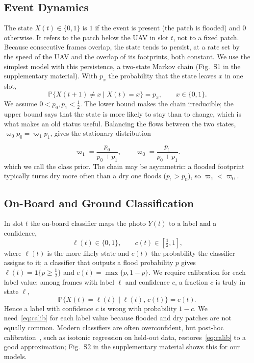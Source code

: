 \documentclass[10pt,journal,compsoc]{IEEEtran}
\theoremstyle{remark}
\newcommand{\Prob}{\mathbb{P}}
\newcommand{\ind}[1]{\mathbf{1}\{#1\}}
\newcommand{\lab}{\ell}
\begin{document}
\subsection{Event Dynamics}\label{sec:src}
The state $X(t)\in\{0,1\}$ is $1$ if the event is present (the patch is flooded) and $0$ otherwise. It refers to the patch below the UAV in slot $t$, not to a fixed patch. Because consecutive frames overlap, the state tends to persist, at a rate set by the speed of the UAV and the overlap of its footprints, both constant. We use the simplest model with this persistence, a two-state Markov chain (Fig.~S1 in the supplementary material). With $p_x$ the probability that the state leaves $x$ in one slot,
\begin{equation}\label{eq:source}
\Prob\big\{X(t+1)\neq x\mid X(t)=x\big\}=p_x,\qquad x\in\{0,1\}.
\end{equation}
We assume $0<p_0,p_1<\tfrac12$. The lower bound makes the chain irreducible; the upper bound says that the state is more likely to stay than to change, which is what makes an old status useful. Balancing the flows between the two states, $\varpi_0p_0=\varpi_1p_1$, gives the stationary distribution

\begin{equation}\label{eq:stationary}
\varpi_1=\frac{p_0}{p_0+p_1},\qquad \varpi_0=\frac{p_1}{p_0+p_1}.
\end{equation}
which we call the class prior. The chain may be asymmetric: a flooded footprint typically turns dry more often than a dry one floods ($p_1>p_0$), so $\varpi_1<\varpi_0$.

\subsection{On-Board and Ground Classification}
In slot $t$ the on-board classifier maps the photo $Y(t)$ to a label and a confidence,
\begin{equation}\label{eq:label}
\lab(t)\in\{0,1\},\qquad c(t)\in[\tfrac12,1],
\end{equation}
where $\lab(t)$ is the more likely state and $c(t)$ the probability the classifier assigns to it; a classifier that outputs a flood probability $p$ gives $\lab(t)=\ind{p\ge\frac12}$ and $c(t)=\max\{p,1-p\}$. We require calibration for each label value: among frames with label $\lab$ and confidence $c$, a fraction $c$ is truly in state $\lab$,
\begin{equation}\label{eq:calib}
\Prob\big\{X(t)=\lab(t)\mid\lab(t),\,c(t)\big\}=c(t).
\end{equation}
Hence a label with confidence $c$ is wrong with probability $1-c$. We need~\eqref{eq:calib} for each label value because flooded and dry patches are not equally common. Modern classifiers are often overconfident, but post-hoc calibration~\cite{guo2017calibration}, such as isotonic regression on held-out data, restores~\eqref{eq:calib} to a good approximation; Fig.~S2 in the supplementary material shows this for our models.
\end{document}
